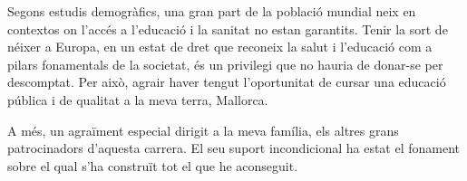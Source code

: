 
\begin{agraiments}
Segons estudis demogràfics, una gran part de la població mundial neix en contextos on l'accés a l'educació i la sanitat no estan garantits. Tenir la sort de néixer a Europa, en un estat de dret que reconeix la salut i l'educació com a pilars fonamentals de la societat, és un privilegi que no hauria de donar-se per descomptat. Per això, agrair haver tengut l'oportunitat de cursar una educació pública i de qualitat a la meva terra, Mallorca.

A més, un agraïment especial dirigit a la meva família, els altres grans patrocinadors d'aquesta carrera. El seu suport incondicional ha estat el fonament sobre el qual s'ha construït tot el que he aconseguit.
\end{agraiments}
